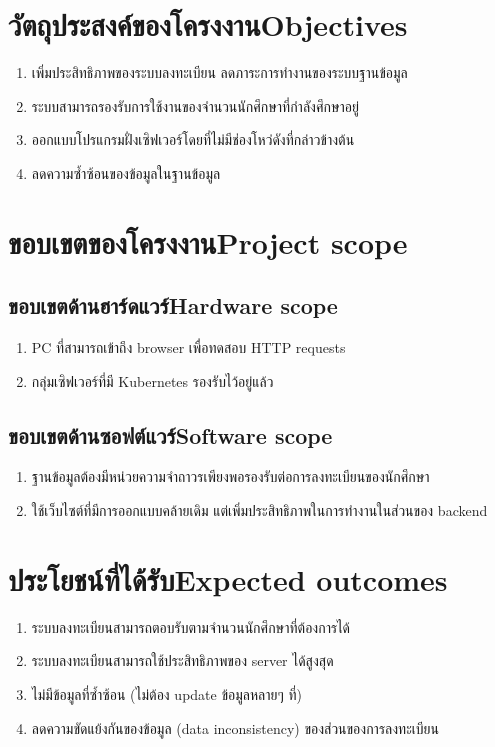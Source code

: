 \section{\ifcpe วัตถุประสงค์ของโครงงาน\else Objectives\fi}
\begin{enumerate}
    \item เพิ่มประสิทธิภาพของระบบลงทะเบียน ลดภาระการทำงานของระบบฐานข้อมูล
    \item ระบบสามารถรองรับการใช้งานของจำนวนนักศึกษาที่กำลังศึกษาอยู่
    \item ออกแบบโปรแกรมฝั่งเซิฟเวอร์โดยที่ไม่มีช่องโหว่ดังที่กล่าวข้างต้น
    \item ลดความซ้ำซ้อนของข้อมูลในฐานข้อมูล
\end{enumerate}

\section{\ifcpe ขอบเขตของโครงงาน\else Project scope\fi}

\subsection{\ifcpe ขอบเขตด้านฮาร์ดแวร์\else Hardware scope\fi}
\begin{enumerate}
    \item PC ที่สามารถเข้าถึง browser เพื่อทดสอบ HTTP requests
    \item กลุ่มเซิฟเวอร์ที่มี Kubernetes รองรับไว้อยู่แล้ว
\end{enumerate}
\subsection{\ifcpe ขอบเขตด้านซอฟต์แวร์\else Software scope\fi}
\begin{enumerate}
    \item ฐานข้อมูลต้องมีหน่วยความจำถาวรเพียงพอรองรับต่อการลงทะเบียนของนักศึกษา
    \item ใช้เว็บไซต์ที่มีการออกแบบคล้ายเดิม แต่เพิ่มประสิทธิภาพในการทำงานในส่วนของ backend
\end{enumerate}
\section{\ifcpe ประโยชน์ที่ได้รับ\else Expected outcomes\fi}
\begin{enumerate}
    \item ระบบลงทะเบียนสามารถตอบรับตามจำนวนนักศึกษาที่ต้องการได้
    \item ระบบลงทะเบียนสามารถใช้ประสิทธิภาพของ server ได้สูงสุด
    \item ไม่มีข้อมูลที่ซ้ำซ้อน (ไม่ต้อง update ข้อมูลหลายๆ ที่)
    \item ลดความขัดแย้งกันของข้อมูล (data inconsistency) ของส่วนของการลงทะเบียน
\end{enumerate}

